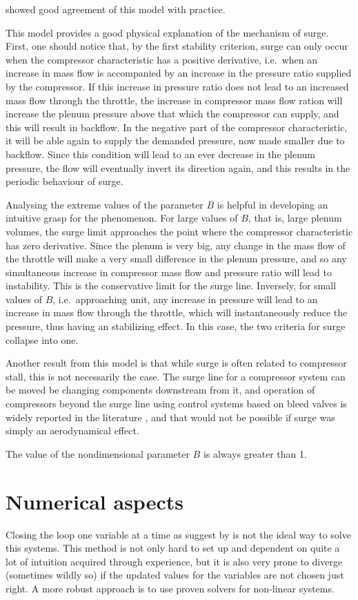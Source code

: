 \documentclass[tcc]{subfiles}
\begin{document}
\textcite{Gravdahl} showed good agreement of this model with practice.

This model provides a good physical explanation of the mechanism of surge. 
First, one should notice that, by the first stability criterion, surge can only occur when the compressor characteristic has a positive derivative, 
i.e.\ when an increase in mass flow is accompanied by an increase in the pressure ratio supplied by the compressor. 
If this increase in pressure ratio does not lead to an increased mass flow through the throttle, the increase in compressor mass flow ration will increase the plenum pressure above that which the compressor can supply, and this will result in backflow. In the negative part of the compressor characteristic, it will be able again to supply the demanded pressure, now made smaller due to backflow. Since this condition will lead to an ever decrease in the plenum pressure, the flow will eventually invert its direction again, and this results in the periodic behaviour of surge.

Analysing the extreme values of the parameter $B$ is helpful in developing an intuitive grasp for the phenomenon.
For large values of $B$, that is, large plenum volumes, the surge limit approaches the point where the compressor characteristic has zero derivative. Since the plenum is very big, any change in the mass flow of the throttle will make a very small difference in the plenum pressure, and so any simultaneous increase in compressor mass flow and pressure ratio will lead to instability. This is the conservative limit for the surge line.
Inversely, for small values of $B$, i.e.\ approaching unit, any increase in pressure will lead to an increase in mass flow through the throttle, which will instantaneously reduce the pressure, thus having an stabilizing effect. 
In this case, the two criteria for surge collapse into one.


Another result from this model is that while surge is often related to compressor stall, this is not necessarily the case.
The surge line for a compressor system can be moved be changing components downstream from it, and operation of compressors beyond the surge line using control systems based on bleed valves is widely reported in the literature \cite{bla}, and that would not be possible if surge was simply an aerodynamical effect.

The value of the nondimensional parameter $B$ is always greater than 1. 

\section{Numerical aspects}
Closing the loop one variable at a time as suggest by \textcite{walsh2004gas} is not the ideal way to solve this systems. This method is not only hard to set up and dependent on quite a lot of intuition acquired through experience, but it is also very prone to diverge (sometimes wildly so) if the updated values for the variables are not chosen just right. A more robust approach is to use proven solvers for non-linear systems.
\end{document}
